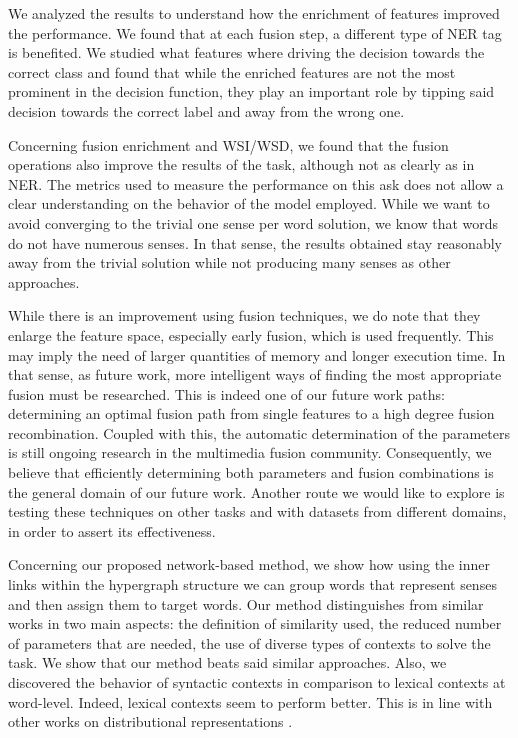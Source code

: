 
We analyzed the results to understand how the enrichment of features improved the performance. We found that at each fusion step, a different type of NER tag is benefited. We studied what features where driving the decision towards the correct class and found that while the enriched features are not the most prominent  in the decision function, they play an important role by tipping said decision towards the correct label and away from the wrong one. 

Concerning fusion enrichment and WSI/WSD, we found that the fusion operations also improve the results of the task, although not as clearly as in NER. The metrics used to measure the performance on this ask does not allow a clear understanding on the behavior of the model employed. While we want to avoid converging to the trivial one sense per word solution, we know that words do not have numerous senses. In that sense, the results obtained stay reasonably away from the trivial solution while not producing many senses as other approaches.

While there is an improvement using fusion techniques, we do note that they  enlarge the feature space, especially early fusion, which is used frequently. This may imply the need of larger quantities of memory and longer execution time. In that sense, as future work, more intelligent ways of finding the most appropriate fusion must be researched. This is indeed one of our future work paths: determining an optimal fusion path from single features to a high degree fusion recombination. Coupled with this, the automatic determination of the parameters is still ongoing research in the multimedia fusion community. Consequently, we believe that efficiently determining both parameters and fusion combinations is the general domain of our future work. Another route we would like to explore is testing these techniques on other tasks and with datasets from different domains, in order to assert its effectiveness.


Concerning our proposed network-based method, we show how using the inner links within the hypergraph structure we can group words that represent senses and then assign them to target words. Our method distinguishes from similar works in two main aspects: the definition of similarity used, the reduced number of parameters that are needed, the use of diverse types of contexts to solve the task. 	We show that our method beats said similar approaches. Also, we discovered the behavior of syntactic contexts in comparison to lexical contexts at word-level. Indeed, lexical contexts seem to perform better. This is in line with other works on distributional representations \cite{kiela2014systematic}.




